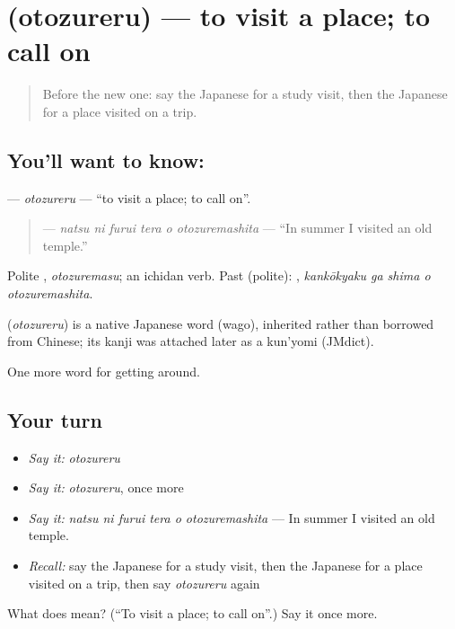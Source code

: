 \section[\texorpdfstring{\ja{おとずれる} (otozureru)}{おとずれる (otozureru)}]{ (otozureru) — to visit a place; to call on}

\label{lesson:JA-C403-otozureru}



\begin{quote}
Before the new one: say the Japanese for a study visit, then the Japanese for a place visited on a trip.
\end{quote}

\subsection*{You'll want to know: }
\textbf{} — \emph{otozureru} — \textquotedblleft{}to visit a place; to call on\textquotedblright{}.

\begin{quote}
\textbf{   } — \emph{natsu ni furui tera o otozuremashita} — \textquotedblleft{}In summer I visited an old temple.\textquotedblright{}
\end{quote}

Polite \textbf{}, \emph{otozuremasu}; an ichidan verb. Past (polite): \textbf{  }, \emph{kankōkyaku ga shima o otozuremashita}.

\begin{cousinweb}
\textbf{} (\emph{otozureru}) is a native Japanese word (wago), inherited rather than borrowed from Chinese; its kanji was attached later as a kun'yomi (JMdict).
\end{cousinweb}

\begin{grammarlens}[title={What you've built}]
One more word for getting around.
\end{grammarlens}

\subsection*{Your turn}
\begin{itemize}
\raggedright
  \item \emph{Say it:} \emph{otozureru}
  \item \emph{Say it:} \emph{otozureru}, once more
  \item \emph{Say it:} \emph{natsu ni furui tera o otozuremashita} — In summer I visited an old temple.
  \item \emph{Recall:} say the Japanese for a study visit, then the Japanese for a place visited on a trip, then say \emph{otozureru} again
\end{itemize}

\begin{tcolorbox}[breakable,colback=teal!4,colframe=teal!35!black,title={Before you move on}]
What does  mean? (\textquotedblleft{}To visit a place; to call on\textquotedblright{}.) Say it once more.
\end{tcolorbox}
